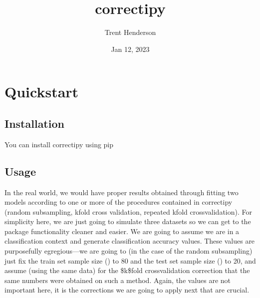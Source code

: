 \documentclass[letterpaper,10pt,english]{sphinxmanual}
\title{correctipy}
\date{Jan 12, 2023}
\author{Trent Henderson}
\begin{document}
\pagestyle{empty}
\sphinxmaketitle
\pagestyle{plain}
\sphinxtableofcontents
\pagestyle{normal}
\label{\detokenize{index::doc}}



\chapter{Quickstart}
\label{\detokenize{quickstart:quickstart}}\label{\detokenize{quickstart::doc}}

\section{Installation}
\label{\detokenize{quickstart:installation}}
You can install correctipy using pip

\begin{sphinxVerbatim}[commandchars=\\\{\}]
  
\end{sphinxVerbatim}


\section{Usage}
\label{\detokenize{quickstart:usage}}
In the real world, we would have proper results obtained through fitting two models according to one or more of the procedures contained in correctipy (random subsampling, k\sphinxhyphen{}fold cross validation, repeated k\sphinxhyphen{}fold cross\sphinxhyphen{}validation). For simplicity here, we are just going to simulate three datasets so we can get to the package functionality cleaner and easier. We are going to assume we are in a classification context and generate classification accuracy values. These values are purposefully egregious—we are going to (in the case of the random subsampling) just fix the train set sample size () to 80 and the test set sample size () to 20, and assume (using the same data) for the \$k\$\sphinxhyphen{}fold cross\sphinxhyphen{}validation correction that the same numbers were obtained on such a method. Again, the values are not important here, it is the corrections we are going to apply next that are crucial.
\end{document}
